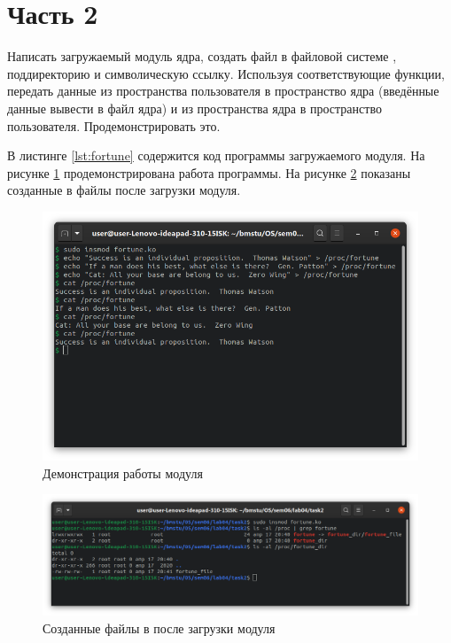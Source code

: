 \documentclass[a4paper,oneside,12pt]{extreport}
\begin{document}
\section*{Часть 2}

\begin{task*}
	Написать загружаемый модуль ядра, создать файл в файловой системе , поддиректорию и символическую ссылку.
	Используя соответствующие функции, передать данные из пространства пользователя в пространство ядра (введённые данные вывести в файл ядра) и из пространства ядра в пространство пользователя.
	Продемонстрировать это.
\end{task*}

В листинге \ref{lst:fortune} содержится код программы загружаемого модуля.
На рисунке \ref{img:task2-fortune} продемонстрирована работа программы.
На рисунке \ref{img:task2-proc} показаны созданные в  файлы после загрузки модуля.



\begin{figure}[H]
	\centering
	\includegraphics[width=\linewidth]{inc/img/task2-fortune}
	\caption{Демонстрация работы модуля }
	\label{img:task2-fortune}
\end{figure}

\begin{figure}[H]
	\centering
	\includegraphics[width=\linewidth]{inc/img/task2-proc}
	\caption{Созданные файлы в  после загрузки модуля}
	\label{img:task2-proc}
\end{figure}
\end{document}
